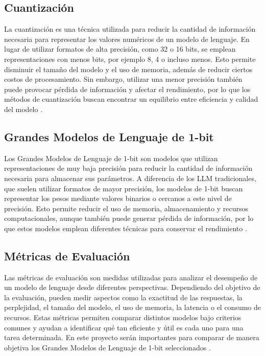 \subsection{Cuantización}

La cuantización es una técnica utilizada para reducir la cantidad de información necesaria para representar los valores numéricos de un modelo de lenguaje. En lugar de utilizar formatos de alta precisión, como 32 o 16 bits, se emplean representaciones con menos bits, por ejemplo 8, 4 o incluso menos. Esto permite disminuir el tamaño del modelo y el uso de memoria, además de reducir ciertos costos de procesamiento. Sin embargo, utilizar una menor precisión también puede provocar pérdida de información y afectar el rendimiento, por lo que los métodos de cuantización buscan encontrar un equilibrio entre eficiencia y calidad del modelo \cite{lowBitSurvey}.

\subsection{Grandes Modelos de Lenguaje de 1-bit}

Los Grandes Modelos de Lenguaje de 1-bit son modelos que utilizan representaciones de muy baja precisión para reducir la cantidad de información necesaria para almacenar sus parámetros. A diferencia de los LLM tradicionales, que suelen utilizar formatos de mayor precisión, los modelos de 1-bit buscan representar los pesos mediante valores binarios o cercanos a este nivel de precisión. Esto permite reducir el uso de memoria, almacenamiento y recursos computacionales, aunque también puede generar pérdida de información, por lo que estos modelos emplean diferentes técnicas para conservar el rendimiento \cite{lowBitSurvey}.

\subsection{Métricas de Evaluación}

Las métricas de evaluación son medidas utilizadas para analizar el desempeño de un modelo de lenguaje desde diferentes perspectivas. Dependiendo del objetivo de la evaluación, pueden medir aspectos como la exactitud de las respuestas, la perplejidad, el tamaño del modelo, el uso de memoria, la latencia o el consumo de recursos. Estas métricas permiten comparar distintos modelos bajo criterios comunes y ayudan a identificar qué tan eficiente y útil es cada uno para una tarea determinada. En este proyecto serán importantes para comparar de manera objetiva los Grandes Modelos de Lenguaje de 1-bit seleccionados \cite{llmEvaluation}.

